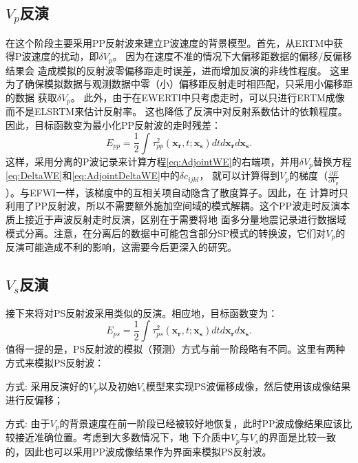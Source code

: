 $\quad$

$\quad$

$\quad$
\subsection{$V_p$反演}
在这个阶段主要采用PP反射波来建立P波速度的背景模型。首先，从ERTM中获得P波速度的扰动，即$\delta V_p$。
因为在速度不准的情况下大偏移距数据的偏移/反偏移结果会
造成模拟的反射波零偏移距走时误差，进而增加反演的非线性程度。
这里为了确保模拟数据与观测数据中零（小）偏移距反射走时相匹配，只采用小偏移距的数据
获取$\delta V_p$。
此外，由于在EWERTI中只考虑走时，可以只进行ERTM成像
而不是ELSRTM来估计反射率。
这也降低了反演中对反射系数估计的依赖程度。因此，目标函数变为最小化PP反射波的走时残差：
\begin{equation}
    E_{pp}=\frac{1}{2}\int\tau^2_{pp}(\mathbf{x_r},t;\mathbf{x_s})dtd\mathbf{x_r}d\mathbf{x_s}.
    \label{eq:ObjectivefunctionPP} 
\end{equation}
这样，采用分离的P波记录来计算方程\eqref{eq:AdjointWE}的右端项，并用$\delta V_p$替换方程\eqref{eq:DeltaWE}和\eqref{eq:AdjointDeltaWE}中的$\delta c_{ijkl}$，
就可以计算得到$V_p$的梯度（$\frac{\partial E}{\partial V_p}$）。与EFWI一样，该梯度中的互相关项自动隐含了散度算子。因此，在
计算时只利用了PP反射波，所以不需要额外施加空间域的模式解耦。这个PP波走时反演本质上接近于声波反射走时反演，区别在于需要将地
面多分量地震记录进行数据域模式分离。注意，在分离后的数据中可能包含部分SP模式的转换波，它们对$V_p$的反演可能造成不利的影响，这需要今后更深入的研究。

\subsection{$V_s$反演}
接下来将对PS反射波采用类似的反演。相应地，目标函数变为：
\begin{equation}
    E_{ps}=\frac{1}{2}\int\tau^2_{ps}(\mathbf{x_r},t;\mathbf{x_s})dtd\mathbf{x_r}d\mathbf{x_s}.
    \label{eq:ObjectivefunctionPS} 
\end{equation}
值得一提的是，PS反射波的模拟（预测）方式与前一阶段略有不同。这里有两种方式来模拟PS反射波：

方式\uppercase\expandafter{}: 采用反演好的$V_p$以及初始$V_s$模型来实现PS波偏移成像，然后使用该成像结果进行反偏移；

方式\uppercase\expandafter{}: 由于$V_p$的背景速度在前一阶段已经被较好地恢复，此时PP波成像结果应该比较接近准确位置。考虑到大多数情况下，地
下介质中$V_p$与$V_s$的界面是比较一致的，因此也可以采用PP波成像结果作为界面来模拟PS反射波。

